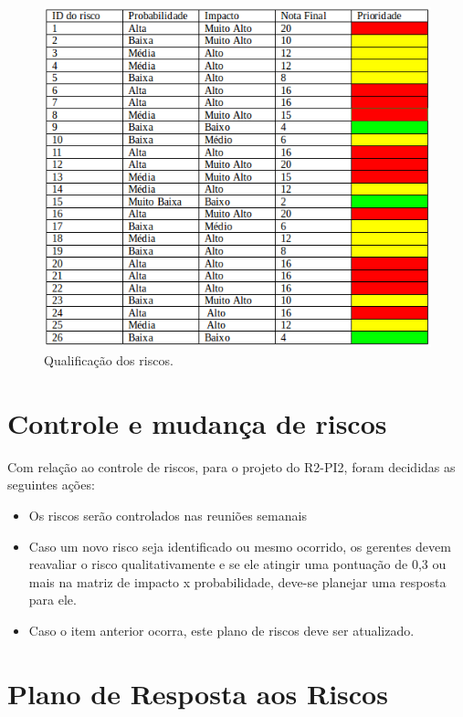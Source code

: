	\begin{figure}[H]
		\centering
		\includegraphics[scale=0.8]{figuras/riscosQualitativo.png}
		\caption{Qualificação dos riscos.}
		\label{img:ear}
	\end{figure}

\section{Controle e mudança de riscos} %
\label{sec:controle_e_mudança_de_riscos}

	Com relação ao controle de riscos, para o projeto do R2-PI2, foram decididas as seguintes ações: 
	\begin{itemize}
		\item Os riscos serão controlados nas reuniões semanais
		\item Caso um novo risco seja identificado ou mesmo ocorrido, os gerentes devem reavaliar o risco qualitativamente e se ele atingir uma pontuação de 0,3 ou mais na matriz de impacto x probabilidade, deve-se planejar uma resposta para ele.
		\item Caso o item anterior ocorra, este plano de riscos deve ser atualizado.
	\end{itemize}

\section{Plano de Resposta aos Riscos} %
\label{sec:plano_de_resposta_aos_riscos}

